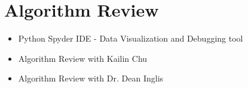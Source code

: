 \section{Algorithm Review}
\begin{itemize}
\item Python Spyder IDE - Data Visualization and Debugging tool
\item Algorithm Review with Kailin Chu
\item Algorithm Review with Dr. Dean Inglis
\end{itemize}


%
%
%
%
%		
%		
%	
%
